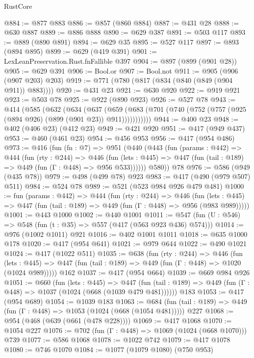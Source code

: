 \begin{lexlean}{RustCore}
\begin{coremodule}
@884 := @877 @883
@886 := @857 (@860 @884)
@887 := @431 @28
@888 := @630 @887
@889 := @886 @888
@890 := @629 @387
@891 := @503 @117
@893 := @889 (@890 @891)
@894 := @629 @35
@895 := @527 @117
@897 := @893 (@894 @895)
@899 := @629 (@419 @391)
@901 := LexLeanPreservation.Rust.fnFallible @397
@904 := @897 (@899 (@901 @28))
@905 := @629 @391
@906 := Bool.or
@907 := Bool.not
@911 := @905 (@906 (@907 @203) @203)
@919 := @771 (@780 (@817 (@834 (@840 (@849 (@904 @911)) @883))))
@920 := @431 @23
@921 := @630 @920
@922 := @919 @921
@923 := @503 @78
@925 := @922 (@890 @923)
@926 := @527 @78
@943 := @414
    (@585
      (@632
        (@634
          (@637
            (@659 (@683 (@701 (@740 (@752 (@757 (@925 (@894 @926) (@899 (@901 @23)) @911)))))))))))
@944 := @400 @23
@948 := @402 (@406 @23) (@412 @23)
@949 := @421 @920
@951 := @417 (@949 @437)
@953 := @460 (@461 @23)
@954 := @456 @953
@956 := @417 (@954 @486)
@973 := @416
    (fun (fn : @7) =>
    @951
      (@440
        (@443
          (fun (params : @442) =>
          @444
            (fun (rty : @244) =>
            @446
              (fun (lets : @445) =>
              @447 (fun (tail : @189) => @449 (fun (Γ : @448) => @956 @533))))))
        @580))
    @78
@976 := @586 (@949 (@435 @78))
@979 := @498 (@499 @78) @923
@983 := @417 (@490 (@979 @507) @511)
@984 := @524 @78
@989 := @521 (@523 @984 @926 @479 @481)
@1000 := fun (params : @442) =>
  @444
    (fun (rty : @244) =>
    @446
      (fun (lets : @445) => @447 (fun (tail : @189) => @449 (fun (Γ : @448) => @956 (@983 @989)))))
@1001 := @443 @1000
@1002 := @440 @1001
@1011 := @547 (fun (U : @546) => @548 (fun (t : @35) => @557 (@417 (@563 @923 @436) @574)))
@1014 := @976 (@1002 @1011) @921
@1016 := @402 @1001 @1011
@1018 := @635 @1000 @178
@1020 := @417 (@954 @641)
@1021 := @979 @644
@1022 := @490 @1021
@1024 := @417 (@1022 @511)
@1035 := @638
    (fun (rty : @244) =>
    @446
      (fun (lets : @445) =>
      @447 (fun (tail : @189) => @449 (fun (Γ : @448) => @1020 (@1024 @989)))))
    @162
@1037 := @417 (@954 @664)
@1039 := @669 @984 @926
@1051 := @660
    (fun (lets : @445) =>
    @447 (fun (tail : @189) => @449 (fun (Γ : @448) => @1037 (@1024 (@668 (@1039 @479 @481))))))
    @183
@1053 := @417 (@954 @689)
@1054 := @1039 @183
@1063 := @684 (fun (tail : @189) => @449 (fun (Γ : @448) => @1053 (@1024 (@668 (@1054 @481))))) @227
@1068 := @954 (@468 (@639 (@661 (@478 @228))))
@1069 := @417 @1068
@1070 := @1054 @227
@1076 := @702 (fun (Γ : @448) => @1069 (@1024 (@668 @1070))) @739
@1077 := @586 @1068
@1078 := @1022 @742
@1079 := @417 @1078
@1080 := @746 @1070
@1084 := @1077 (@1079 @1080) (@750 @953)

\end{coremodule}
\end{lexlean}
